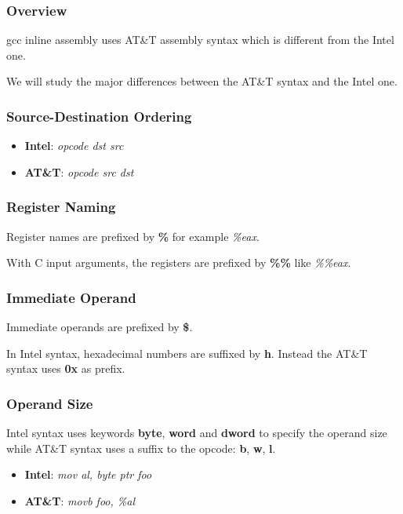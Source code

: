 \documentclass[8pt]{beamer}
\newcommand{\nl}[0]{\vspace{0.4cm}}
\begin{document}
\begin{frame}
  \frametitle{Overview}

  gcc inline assembly uses AT\&T assembly syntax which is
  different from the Intel one.

  \nl

  We will study the major differences between the AT\&T syntax and the
  Intel one.
\end{frame}


\begin{frame}
  \frametitle{Source-Destination Ordering}

  \begin{itemize}
    \item
      \textbf{Intel}: \textit{opcode dst src}
    \item
      \textbf{AT\&T}: \textit{opcode src dst}
  \end{itemize}
\end{frame}


\begin{frame}
  \frametitle{Register Naming}

  Register names are prefixed by \textbf{\%} for example \textit{\%eax}.

  \nl

  With C input arguments, the registers are prefixed by \textbf{\%\%}
  like \textit{\%\%eax}.
\end{frame}


\begin{frame}
  \frametitle{Immediate Operand}

  Immediate operands are prefixed by \textbf{\$}.

  \nl

  In Intel syntax, hexadecimal numbers are suffixed by \textbf{h}.
  Instead the AT\&T syntax uses \textbf{0x} as prefix.
\end{frame}


\begin{frame}
  \frametitle{Operand Size}

  Intel syntax uses keywords \textbf{byte}, \textbf{word} and
  \textbf{dword} to specify the operand size while AT\&T syntax uses
  a suffix to the opcode: \textbf{b}, \textbf{w}, \textbf{l}.

  \begin{itemize}
    \item
      \textbf{Intel}: \textit{mov al, byte ptr foo}
    \item
      \textbf{AT\&T}: \textit{movb foo, \%al}
  \end{itemize}
\end{frame}
\end{document}
